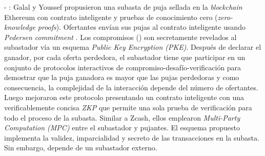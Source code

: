     - \cite{galalyusef2018a}: Galal y Youssef propusieron una subasta de puja sellada en la \textit{blockchain} Ethereum con contrato 
    inteligente y pruebas de conocimiento cero (\textit{zero-knowledge proofs}). Ofertantes envían sus pujas al contrato inteligente usando
    \textit{Pedersen commitment} \cite{pedersen1991}. Los compromisos () son secretamente revelados al subastador vía
    un esquema \textit{Public Key Encryption (PKE)}. Después de declarar el ganador, por cada oferta perdedora, el subastador tiene que
    participar en un conjunto de protocolos interactivos de compromiso-desafío-verificación para demostrar que la puja ganadora es mayor que 
    las pujas perdedoras y como consecuencia, la complejidad de la interacción depende del número de ofertantes. Luego 
    \cite{galalyusef2018b} mejoraron este protocolo presentando un contrato inteligente con una verificablemente concisa \textit{ZKP}
    que permite una sola prueba de verificación para todo el proceso de la subasta. Similar a Zcash, ellos emplearon \textit{Multi-Party 
    Computation (MPC)} entre el subastador y pujantes. El esquema propuesto implementa la validez, imparcialidad
    y secreto de las transacciones en la subasta. Sin embargo, depende de un subastador externo.
    
    


